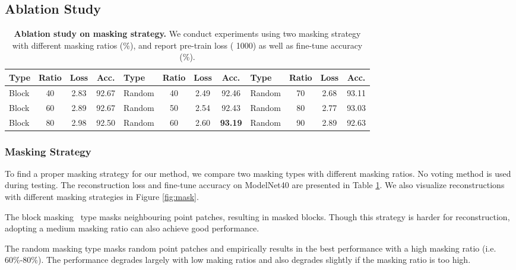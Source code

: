 \documentclass[runningheads]{llncs}
\begin{document}
\subsection{Ablation Study}
\label{sec:mask}
\begin{table}
\vspace{-3mm}
\begin{center}
\caption{{\bf Ablation study on masking strategy.} We conduct experiments using two masking strategy with different masking ratios (\%), and report pre-train loss ( 1000) as well as fine-tune accuracy (\%).}
\setlength\tabcolsep{2pt}
\label{tb:mask}
\begin{tabular}{|lccc|lccc|lccc|}
\hline
Type & Ratio & Loss & Acc. \quad &Type & Ratio & Loss & Acc. \quad &Type & Ratio & Loss & Acc. \quad  \\
\hline
Block & 40 & 2.83 &  92.67 \quad &Random & 40 & 2.49 & 92.46 \quad &Random & 70 & 2.68 & 93.11 \quad\\
Block & 60 & 2.89 & 92.67 \quad &Random & 50 & 2.54 & 92.43 \quad &Random & 80 & 2.77 & 93.03 \quad \\
Block & 80 & 2.98 & 92.50 \quad &Random & 60 & 2.60 & {\bf 93.19} \quad &Random & 90 & 2.89 & 92.63 \quad \\
\hline
\end{tabular}
\end{center}
\vspace{-13mm}
\end{table}

\subsubsection{Masking Strategy}
To find a proper masking strategy for our method, we compare two masking types with different masking ratios. No voting method is used during testing. The reconstruction loss and fine-tune accuracy on ModelNet40 are presented in Table \ref{tb:mask}. We also visualize reconstructions with different masking strategies in Figure \ref{fig:mask}. 

The block masking~\cite{pointbert,cv2} type masks neighbouring point patches, resulting in masked blocks. Though this strategy is harder for reconstruction, adopting a medium masking ratio can also achieve good performance.

The random masking type masks random point patches and empirically results in the best performance with a high masking ratio (i.e. 60\%-80\%). The performance degrades largely with low making ratios and also degrades slightly if the masking ratio is too high. 
\end{document}
